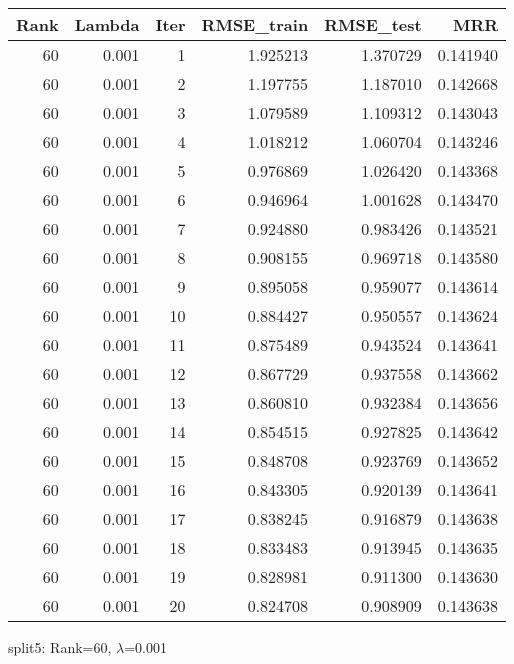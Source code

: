 \begin{tabular}{rrrrrr}
\toprule
 Rank &  Lambda &  Iter &  RMSE\_train &  RMSE\_test &       MRR \\
\midrule
   60 &   0.001 &     1 &    1.925213 &   1.370729 &  0.141940 \\
   60 &   0.001 &     2 &    1.197755 &   1.187010 &  0.142668 \\
   60 &   0.001 &     3 &    1.079589 &   1.109312 &  0.143043 \\
   60 &   0.001 &     4 &    1.018212 &   1.060704 &  0.143246 \\
   60 &   0.001 &     5 &    0.976869 &   1.026420 &  0.143368 \\
   60 &   0.001 &     6 &    0.946964 &   1.001628 &  0.143470 \\
   60 &   0.001 &     7 &    0.924880 &   0.983426 &  0.143521 \\
   60 &   0.001 &     8 &    0.908155 &   0.969718 &  0.143580 \\
   60 &   0.001 &     9 &    0.895058 &   0.959077 &  0.143614 \\
   60 &   0.001 &    10 &    0.884427 &   0.950557 &  0.143624 \\
   60 &   0.001 &    11 &    0.875489 &   0.943524 &  0.143641 \\
   60 &   0.001 &    12 &    0.867729 &   0.937558 &  0.143662 \\
   60 &   0.001 &    13 &    0.860810 &   0.932384 &  0.143656 \\
   60 &   0.001 &    14 &    0.854515 &   0.927825 &  0.143642 \\
   60 &   0.001 &    15 &    0.848708 &   0.923769 &  0.143652 \\
   60 &   0.001 &    16 &    0.843305 &   0.920139 &  0.143641 \\
   60 &   0.001 &    17 &    0.838245 &   0.916879 &  0.143638 \\
   60 &   0.001 &    18 &    0.833483 &   0.913945 &  0.143635 \\
   60 &   0.001 &    19 &    0.828981 &   0.911300 &  0.143630 \\
   60 &   0.001 &    20 &    0.824708 &   0.908909 &  0.143638 \\
\bottomrule
\end{tabular}

\caption{split5: Rank=60, $\lambda$=0.001}
